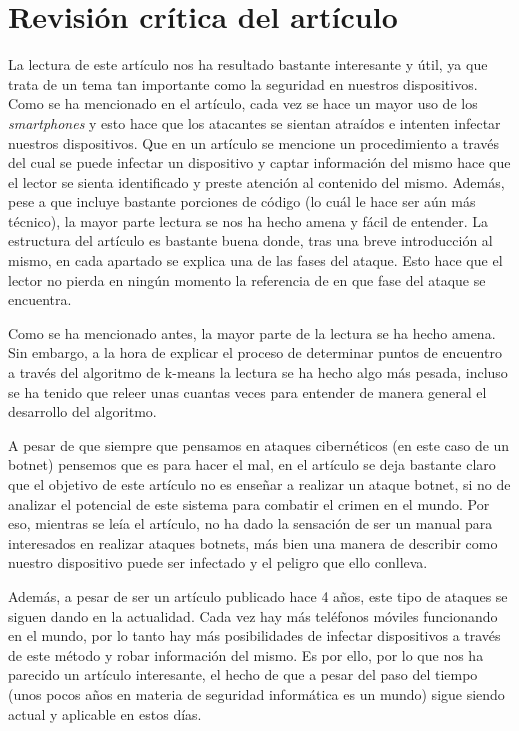 \documentclass[a4paper,11pt]{report}
\begin{document}
\chapter{Revisión crítica del artículo}

La lectura de este artículo nos ha resultado bastante interesante y útil, ya que trata de un tema tan importante como la seguridad en nuestros dispositivos. Como se ha mencionado en el artículo, cada vez se hace un mayor uso de los \emph{smartphones} y esto hace que los atacantes se sientan atraídos e intenten infectar nuestros dispositivos. Que en un artículo se mencione un procedimiento a través del cual se puede infectar un dispositivo y captar información del mismo hace que el lector se sienta identificado y preste atención al contenido del mismo. Además, pese a que incluye bastante porciones de código (lo cuál le hace ser aún más técnico), la mayor parte lectura se nos ha hecho amena y fácil de entender. La estructura del artículo es bastante buena donde, tras una breve introducción al mismo, en cada apartado se explica una de las fases del ataque. Esto hace que el lector no pierda en ningún momento la referencia de en que fase del ataque se encuentra. 

Como se ha mencionado antes, la mayor parte de la lectura se ha hecho amena. Sin embargo, a la hora de explicar el proceso de determinar puntos de encuentro a través del algoritmo de k-means la lectura se ha hecho algo más pesada, incluso se ha tenido que releer unas cuantas veces para entender de manera general el desarrollo del algoritmo. 

A pesar de que siempre que pensamos en ataques cibernéticos (en este caso de un botnet) pensemos que es para hacer el mal, en el artículo se deja bastante claro que el objetivo de este artículo no es enseñar a realizar un ataque botnet, si no de analizar el potencial de este sistema para combatir el crimen en el mundo. Por eso, mientras se leía el artículo, no ha dado la sensación de ser un manual para interesados en realizar ataques botnets, más bien una manera de describir como nuestro dispositivo puede ser infectado y el peligro que ello conlleva.

Además, a pesar de ser un artículo publicado hace 4 años, este tipo de ataques se siguen dando en la actualidad. Cada vez hay más teléfonos móviles funcionando en el mundo, por lo tanto hay más posibilidades de infectar dispositivos a través de este método y robar información del mismo. Es por ello, por lo que nos ha parecido un artículo interesante, el hecho de que a pesar del paso del tiempo (unos pocos años en materia de seguridad informática es un mundo) sigue siendo actual y aplicable en estos días.
\end{document}
